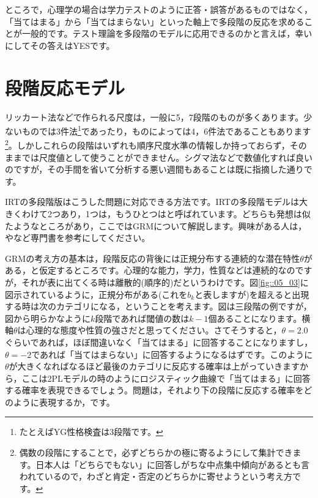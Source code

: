 \documentclass{ltjsbook}
\begin{document}
ところで，心理学の場合は学力テストのように正答・誤答があるものではなく，「当てはまる」から「当てはまらない」といった軸上で多段階の反応を求めることが一般的です。テスト理論を多段階のモデルに応用できるのかと言えば，幸いにしてその答えはYESです。
\section{段階反応モデル}
リッカート法などで作られる尺度は，一般に5，7段階のものが多くあります。少ないものでは3件法\footnote{たとえばYG性格検査は3段階です。}であったり，ものによっては4，6件法であることもあります\footnote{偶数の段階にすることで，必ずどちらかの極に寄るようにして集計できます。日本人は「どちらでもない」に回答しがちな中点集中傾向があるとも言われているので，わざと肯定・否定のどちらかに寄せようという考え方です。}。しかしこれらの段階はいずれも順序尺度水準の情報しか持っておらず，そのままでは尺度値として使うことができません。シグマ法などで数値化すれば良いのですが，その手間を省いて分析する悪い週間もあることは既に指摘した通りです。

IRTの多段階版はこうした問題に対応できる方法です。IRTの多段階モデルは大きくわけて2つあり，1つは\citep{samejima1997graded}，もうひとつは\citep{muraki1992generalized}と呼ばれています。どちらも発想は似たようなところがあり，ここではGRMについて解説します。興味がある人は，\citet{豊田秀樹2012-08-24}や\citet{加藤健太郎2014-07-25}など専門書を参考にしてください。

GRMの考え方の基本は，段階反応の背後には正規分布する連続的な潜在特性$\theta$がある，と仮定するところです。心理的な能力，学力，性質などは連続的なのですが，それが表に出てくる時は離散的(順序的)だというわけです。図\ref{fig::05_03}に図示されているように，正規分布がある(これを$b_k$と表しますが)を超えると出現する時は次のカテゴリになる，ということを考えます。図は三段階の例ですが，図から明らかなように$k$段階であれば閾値の数は$k-1$個あることになります。横軸$\theta$は心理的な態度や性質の強さだと思ってください。さてそうすると，$\theta=2.0$ぐらいであれば，ほぼ間違いなく「当てはまる」に回答することになりますし，$\theta=-2$であれば「当てはまらない」に回答するようになるはずです。このように$\theta$が大きくなればなるほど最後のカテゴリに反応する確率は上がっていきますから，ここは2PLモデルの時のようにロジスティック曲線で「当てはまる」に回答する確率を表現できるでしょう。問題は，それより下の段階に反応する確率をどのように表現するか，です。
\end{document}

